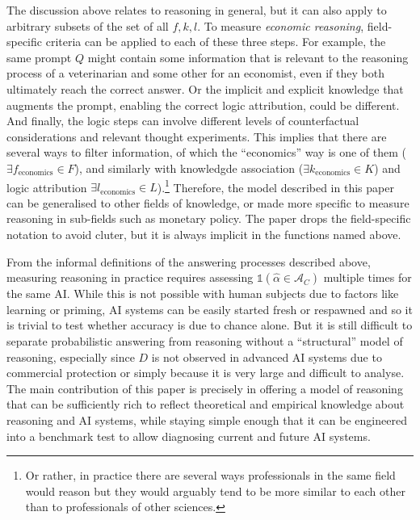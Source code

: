 \documentclass[
]{article}
\begin{document}
The discussion above relates to reasoning in general, but it can also
apply to arbitrary subsets of the set of all \(f, k, l\). To measure
\emph{economic reasoning}, field-specific criteria can be applied to
each of these three steps. For example, the same prompt \(Q\) might
contain some information that is relevant to the reasoning process of a
veterinarian and some other for an economist, even if they both
ultimately reach the correct answer. Or the implicit and explicit
knowledge that augments the prompt, enabling the correct logic
attribution, could be different. And finally, the logic steps can
involve different levels of counterfactual considerations and relevant
thought experiments. This implies that there are several ways to filter
information, of which the ``economics'' way is one of them
(\(\exists f_{\text{economics}} \in F\)), and similarly with knowledgde
association (\(\exists k_{\text{economics}} \in K\)) and logic
attribution \(\exists l_{\text{economics}} \in L\)).\footnote{Or rather,
  in practice there are several ways professionals in the same field
  would reason but they would arguably tend to be more similar to each
  other than to professionals of other sciences.} Therefore, the model
described in this paper can be generalised to other fields of knowledge,
or made more specific to measure reasoning in sub-fields such as
monetary policy. The paper drops the field-specific notation to avoid
cluter, but it is always implicit in the functions named above.

From the informal definitions of the answering processes described
above, measuring reasoning in practice requires assessing
\(\mathbb{1}(\hat{\alpha} \in \mathcal{A}_C)\) multiple times for the
same AI. While this is not possible with human subjects due to factors
like learning or priming, AI systems can be easily started fresh or
respawned and so it is trivial to test whether accuracy is due to chance
alone. But it is still difficult to separate probabilistic answering
from reasoning without a ``structural'' model of reasoning, especially
since \(D\) is not observed in advanced AI systems due to commercial
protection or simply because it is very large and difficult to analyse.
The main contribution of this paper is precisely in offering a model of
reasoning that can be sufficiently rich to reflect theoretical and
empirical knowledge about reasoning and AI systems, while staying simple
enough that it can be engineered into a benchmark test to allow
diagnosing current and future AI systems.
\end{document}
